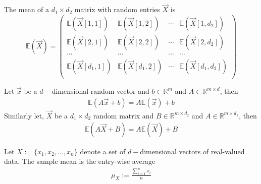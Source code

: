 \documentclass[11pt]{elegantbook}
\begin{document}
\begin{definition}
    The mean of a $d_1\times d_2$ matrix with random entries $\vec{X}$ is
    $$\mathbb{E}(\vec{X})=\begin{pmatrix}
        \mathbb{E}(\vec{X}[1,1])&\mathbb{E}(\vec{X}[1,2])&\cdots &\mathbb{E}(\vec{X}[1,d_2])\\
        \mathbb{E}(\vec{X}[2,1])&\mathbb{E}(\vec{X}[2,2])&\cdots &\mathbb{E}(\vec{X}[2,d_2])\\
        \cdots&\cdots&\cdots&\cdots\\
        \mathbb{E}(\vec{X}[d_1,1])&\mathbb{E}(\vec{X}[d_1,2])&\cdots &\mathbb{E}(\vec{X}[d_1,d_2])\\
    \end{pmatrix}$$
\end{definition}

\begin{lemma}
    Let $\vec{x}$ be a $d-$dimensional random vector and $b\in \mathbb{R}^{m}$ and $A\in \mathbb{R}^{m\times d}$, then
    \begin{equation}
        \begin{aligned}
            \mathbb{E}(A \vec{x}+b)=A \mathbb{E}(\vec{x})+b
        \end{aligned}
        \nonumber
    \end{equation}
    Similarly let, $\vec{X}$ be a $d_1 \times d_2$ random matrix and $B\in \mathbb{R}^{m\times d_2}$ and $A\in \mathbb{R}^{m\times d_1}$, then
    \begin{equation}
        \begin{aligned}
            \mathbb{E}(A \vec{X}+B)=A \mathbb{E}(\vec{X})+B
        \end{aligned}
        \nonumber
    \end{equation}
\end{lemma}

\begin{definition}
    Let $X := \{x_1, x_2, . . ., x_n\}$ denote a set of $d-$dimensional vectors of real-valued data. The sample mean is the entry-wise average
    \begin{equation}
        \begin{aligned}
            \mu_X:=\frac{\sum_{i=1}^n x_i}{n}
        \end{aligned}
        \nonumber
    \end{equation}
\end{definition}
\end{document}
